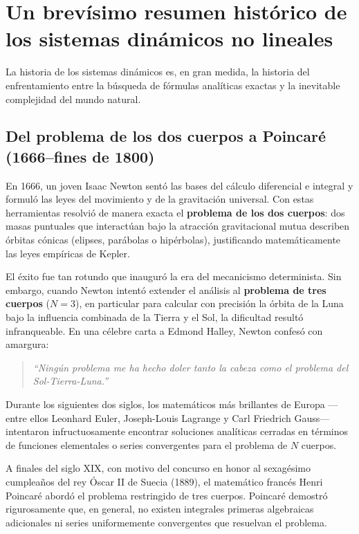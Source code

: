 \section{Un brevísimo resumen histórico de los sistemas dinámicos no lineales}
\label{sec:historia}

La historia de los sistemas dinámicos es, en gran medida, la historia del enfrentamiento entre la búsqueda de fórmulas analíticas exactas y la inevitable complejidad del mundo natural.

\subsection{Del problema de los dos cuerpos a Poincaré (1666--fines de 1800)}

En 1666, un joven Isaac Newton sentó las bases del cálculo diferencial e integral y formuló las leyes del movimiento y de la gravitación universal. Con estas herramientas resolvió de manera exacta el \textbf{problema de los dos cuerpos}: dos masas puntuales que interactúan bajo la atracción gravitacional mutua describen órbitas cónicas (elipses, parábolas o hipérbolas), justificando matemáticamente las leyes empíricas de Kepler.

El éxito fue tan rotundo que inauguró la era del mecanicismo determinista. Sin embargo, cuando Newton intentó extender el análisis al \textbf{problema de tres cuerpos} ($N=3$), en particular para calcular con precisión la órbita de la Luna bajo la influencia combinada de la Tierra y el Sol, la dificultad resultó infranqueable. En una célebre carta a Edmond Halley, Newton confesó con amargura:
\begin{quote}
    \emph{``Ningún problema me ha hecho doler tanto la cabeza como el problema del Sol-Tierra-Luna.''}
\end{quote}

Durante los siguientes dos siglos, los matemáticos más brillantes de Europa —entre ellos Leonhard Euler, Joseph-Louis Lagrange y Carl Friedrich Gauss— intentaron infructuosamente encontrar soluciones analíticas cerradas en términos de funciones elementales o series convergentes para el problema de $N$ cuerpos.

A finales del siglo XIX, con motivo del concurso en honor al sexagésimo cumpleaños del rey Óscar II de Suecia (1889), el matemático francés Henri Poincaré abordó el problema restringido de tres cuerpos. Poincaré demostró rigurosamente que, en general, no existen integrales primeras algebraicas adicionales ni series uniformemente convergentes que resuelvan el problema.

